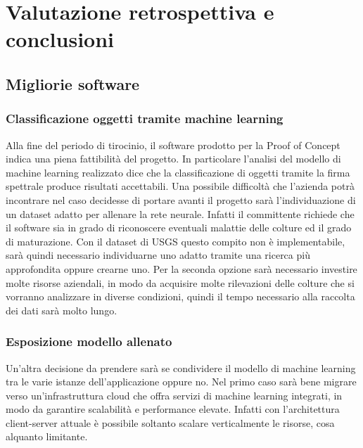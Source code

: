 
\chapter{Valutazione retrospettiva e conclusioni}
\label{cap:conclusione}


\section{Migliorie software}
\subsection{Classificazione oggetti tramite machine learning}
Alla fine del periodo di tirocinio, il software prodotto per la Proof of Concept indica una piena fattibilità del progetto. In particolare l'analisi del modello di machine learning realizzato dice che la classificazione di oggetti tramite la firma spettrale produce risultati accettabili. Una possibile difficoltà che l'azienda potrà incontrare nel caso decidesse di portare avanti il progetto sarà l'individuazione di un dataset adatto per allenare la rete neurale. Infatti il committente richiede che il software sia in grado di riconoscere eventuali malattie delle colture ed il grado di maturazione. Con il dataset di USGS questo compito non è implementabile, sarà quindi necessario individuarne uno adatto tramite una ricerca più approfondita oppure crearne uno. Per la seconda opzione sarà necessario investire molte risorse aziendali, in modo da acquisire molte rilevazioni delle colture che si vorranno analizzare in diverse condizioni, quindi il tempo necessario alla raccolta dei dati sarà molto lungo.

\subsection{Esposizione modello allenato}
Un'altra decisione da prendere sarà se condividere il modello di machine learning tra le varie istanze dell'applicazione oppure no. Nel primo caso sarà bene migrare verso un'infrastruttura cloud che offra servizi di machine learning integrati, in modo da garantire scalabilità e performance elevate. Infatti con l'architettura client-server attuale è possibile soltanto scalare verticalmente le risorse, cosa alquanto limitante.

